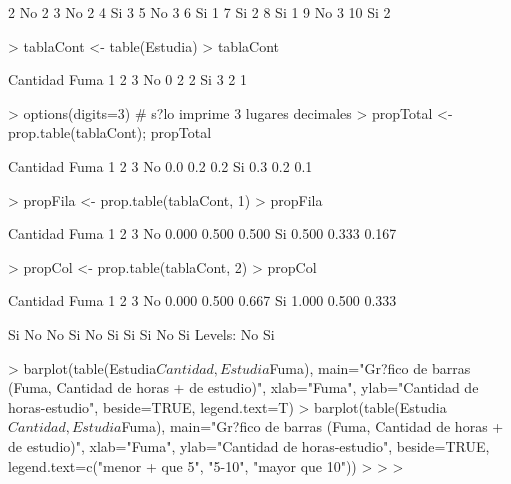 \documentclass{article}
\begin{document}
\begin{Schunk}
\begin{Soutput}
2    No        2
3    No        2
4    Si        3
5    No        3
6    Si        1
7    Si        2
8    Si        1
9    No        3
10   Si        2
\end{Soutput}
\begin{Sinput}
> tablaCont <- table(Estudia)
> tablaCont
\end{Sinput}
\begin{Soutput}
    Cantidad
Fuma 1 2 3
  No 0 2 2
  Si 3 2 1
\end{Soutput}
\begin{Sinput}
> options(digits=3) # s?lo imprime 3 lugares decimales
> propTotal <- prop.table(tablaCont); propTotal
\end{Sinput}
\begin{Soutput}
    Cantidad
Fuma   1   2   3
  No 0.0 0.2 0.2
  Si 0.3 0.2 0.1
\end{Soutput}
\begin{Sinput}
> propFila <- prop.table(tablaCont, 1)
> propFila
\end{Sinput}
\begin{Soutput}
    Cantidad
Fuma     1     2     3
  No 0.000 0.500 0.500
  Si 0.500 0.333 0.167
\end{Soutput}
\begin{Sinput}
> propCol <- prop.table(tablaCont, 2)
> propCol
\end{Sinput}
\begin{Soutput}
    Cantidad
Fuma     1     2     3
  No 0.000 0.500 0.667
  Si 1.000 0.500 0.333
\end{Soutput}
\begin{Soutput}
 [1] Si No No Si No Si Si Si No Si
Levels: No Si
\end{Soutput}
\begin{Sinput}
> barplot(table(Estudia$Cantidad, Estudia$Fuma), main="Gr?fico de barras (Fuma, Cantidad de horas
+ de estudio)", xlab="Fuma", ylab="Cantidad de horas-estudio", beside=TRUE, legend.text=T)
> barplot(table(Estudia$Cantidad, Estudia$Fuma), main="Gr?fico de barras (Fuma, Cantidad de horas
+ de estudio)", xlab="Fuma", ylab="Cantidad de horas-estudio", beside=TRUE, legend.text=c("menor
+ que 5", "5-10", "mayor que 10"))
> 
> 
> 
\end{Sinput}
\end{Schunk}
\end{document}
